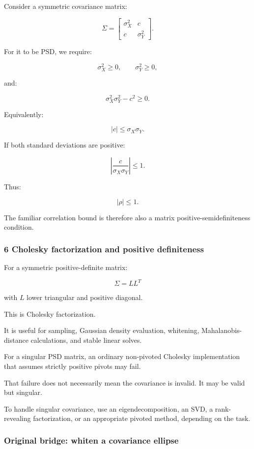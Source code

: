 Consider a symmetric covariance matrix:

\[
 \Sigma= \begin{bmatrix} \sigma_X^2&c\\ c&\sigma_Y^2 \end{bmatrix}.
\]

For it to be PSD, we require:

\[
 \sigma_X^2\ge0, \qquad \sigma_Y^2\ge0,
\]

and:

\[
 \boxed{ \sigma_X^2\sigma_Y^2-c^2\ge0 }.
\]

Equivalently:

\[
 |c|\le\sigma_X\sigma_Y.
\]

If both standard deviations are positive:

\[
 \left|\frac{c}{\sigma_X\sigma_Y}\right|\le1.
\]

Thus:

\[
 \boxed{|\rho|\le1}.
\]

The familiar correlation bound is therefore also a matrix positive-semidefiniteness condition.

\subsubsection{6 Cholesky factorization and positive definiteness}\label{02-foundations-ii-ch024-cholesky-factorization-and-positive-definiteness}

For a symmetric positive-definite matrix:

\[
 \boxed{\Sigma=LL^T}
\]

with \(L\) lower triangular and positive diagonal.

This is Cholesky factorization.

It is useful for sampling, Gaussian density evaluation, whitening, Mahalanobis-distance calculations, and stable linear solves.

For a singular PSD matrix, an ordinary non-pivoted Cholesky implementation that assumes strictly positive pivots may fail.

That failure does not necessarily mean the covariance is invalid. It may be valid but singular.

To handle singular covariance, use an eigendecomposition, an SVD, a rank-revealing factorization, or an appropriate pivoted method, depending on the task.

\subsubsection{Original bridge: whiten a covariance ellipse}\label{02-foundations-ii-ch024-original-bridge-whiten-a-covariance-ellipse}

